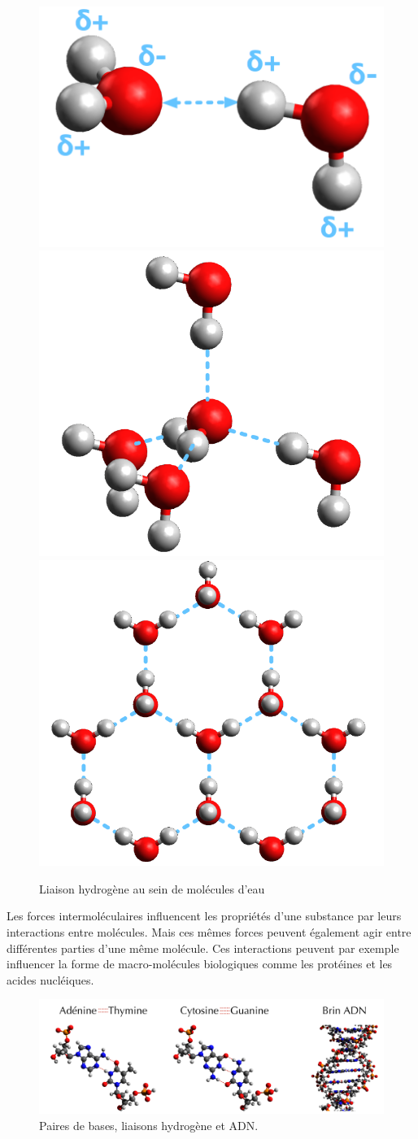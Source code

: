 \documentclass[
  11pt,
  a4paper,
  openany]{book}
\begin{document}
\begin{figure}

{\centering \includegraphics[width=0.25\linewidth]{images/ice-0} \includegraphics[width=0.25\linewidth]{images/ice-tetra} \includegraphics[width=0.25\linewidth]{images/ice} 

}

\caption{Liaison hydrogène au sein de molécules d'eau}\label{fig:eau-liaison-hydrogene}
\end{figure}

Les forces intermoléculaires influencent les propriétés d'une substance par leurs interactions entre molécules. Mais ces mêmes forces peuvent également agir entre différentes parties d'une même molécule. Ces interactions peuvent par exemple influencer la forme de macro-molécules biologiques comme les protéines et les acides nucléiques.

\begin{figure}

{\centering \includegraphics[width=1\linewidth]{images/dna} 

}

\caption{Paires de bases, liaisons hydrogène et ADN.}\label{fig:dna}
\end{figure}
\end{document}
